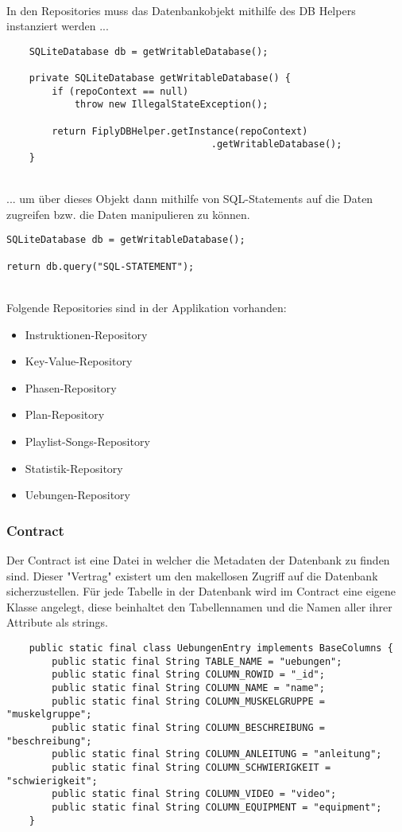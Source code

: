 \documentclass[FIPLY_base.tex]{subfiles}
\begin{document}
\ \\
In den Repositories muss das Datenbankobjekt mithilfe des DB Helpers instanziert werden ...
\ \\
\begin{lstlisting}
    SQLiteDatabase db = getWritableDatabase();

    private SQLiteDatabase getWritableDatabase() {
        if (repoContext == null) 
            throw new IllegalStateException();
	  
        return FiplyDBHelper.getInstance(repoContext)
			      	  		        .getWritableDatabase();
    }
\end{lstlisting}
\ \\
... um über dieses Objekt dann mithilfe von SQL-Statements auf die Daten zugreifen bzw. die Daten manipulieren zu können.
\ \\
\begin{lstlisting}
SQLiteDatabase db = getWritableDatabase();

return db.query("SQL-STATEMENT");
\end{lstlisting}

\ \\
Folgende Repositories sind in der Applikation vorhanden:
\begin{itemize}
\item Instruktionen-Repository
\item Key-Value-Repository
\item Phasen-Repository
\item Plan-Repository
\item Playlist-Songs-Repository
\item Statistik-Repository
\item Uebungen-Repository
\end{itemize}

\newpage
\subsubsection{Contract}
Der Contract ist eine Datei in welcher die Metadaten der Datenbank zu finden sind.
Dieser "Vertrag" existert um den makellosen Zugriff auf die Datenbank sicherzustellen.
Für jede Tabelle in der Datenbank wird im Contract eine eigene Klasse angelegt, diese beinhaltet den Tabellennamen und die Namen aller ihrer Attribute als strings.
\begin{lstlisting}
    public static final class UebungenEntry implements BaseColumns {
        public static final String TABLE_NAME = "uebungen";
        public static final String COLUMN_ROWID = "_id";
        public static final String COLUMN_NAME = "name";
        public static final String COLUMN_MUSKELGRUPPE = "muskelgruppe";
        public static final String COLUMN_BESCHREIBUNG = "beschreibung";
        public static final String COLUMN_ANLEITUNG = "anleitung";
        public static final String COLUMN_SCHWIERIGKEIT = "schwierigkeit";
        public static final String COLUMN_VIDEO = "video";
        public static final String COLUMN_EQUIPMENT = "equipment";
    }
\end{lstlisting}
\end{document}
